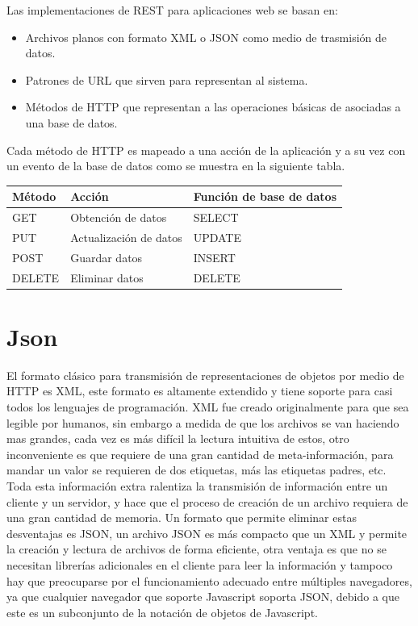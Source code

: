 \documentclass[12pt,a4paper,spanish,openany]{book}
\begin{document}
Las implementaciones de REST para aplicaciones web se basan en:
\begin{itemize}
  \item Archivos planos con formato XML o JSON como medio de trasmisión de
  datos.
  \item Patrones de URL que sirven para representan al sistema.
  \item Métodos de HTTP que representan a las operaciones básicas de  asociadas
  a una base de datos.
\end{itemize}

Cada método de HTTP es mapeado a una acción de la aplicación y a su vez con un
evento de la base de datos como se muestra en la siguiente tabla.

\singlespacing
\begin{center}
\begin{tabular}{|p{3.5cm}|p{6.5cm}|p{3.5cm}|}
\hline
\textbf{Método} & \textbf{Acción} & \textbf{Función de base de datos} \\
\hline
GET & Obtención de datos & SELECT\\
PUT & Actualización de datos & UPDATE\\
POST & Guardar datos & INSERT\\
DELETE & Eliminar datos & DELETE\\
\hline
\end{tabular}
\end{center}



\section{Json}
El formato clásico para transmisión de representaciones de objetos por medio de
HTTP es XML, este formato es altamente extendido y tiene soporte para casi todos
los lenguajes de programación. XML fue creado originalmente para que sea legible
por humanos, sin embargo a medida de que los archivos se van haciendo mas
grandes, cada vez es más difícil la lectura intuitiva de estos, otro inconveniente es que
requiere de una gran cantidad de meta-información, para mandar un valor se
requieren de dos etiquetas, más las etiquetas padres, etc. Toda esta información
extra ralentiza la transmisión de información entre un cliente y un servidor, y
hace que el proceso de creación de un archivo requiera de una gran cantidad de
memoria.
Un formato que permite eliminar estas desventajas es JSON, un archivo
JSON es más compacto que un XML y permite la creación y lectura de archivos de
forma eficiente, otra ventaja es que no se necesitan librerías adicionales en
el cliente para leer la información y tampoco hay que preocuparse por el
funcionamiento adecuado entre múltiples navegadores, ya que cualquier
navegador que soporte Javascript soporta JSON, debido a que este es un
subconjunto de la notación de objetos de Javascript.
\end{document}
